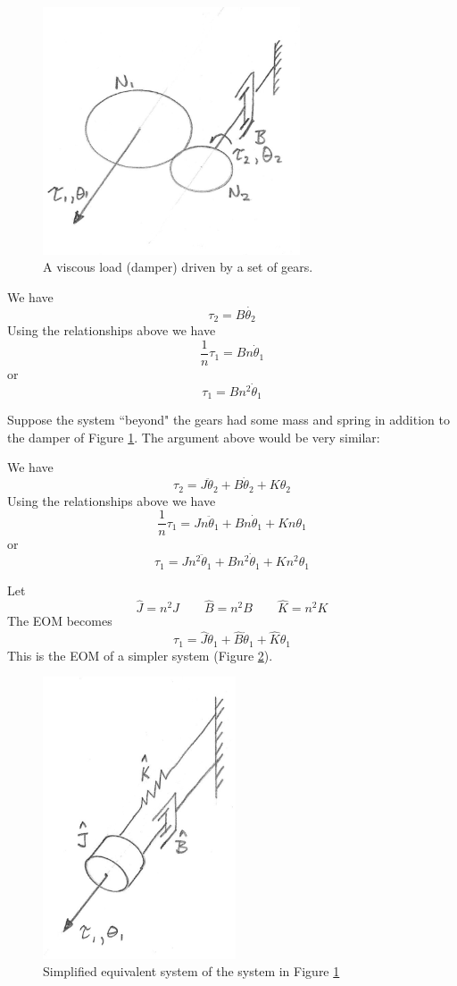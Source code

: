 \begin{figure}\centering
\includegraphics[width=3.0in]{figs03/00745a.png}
\caption{A viscous load (damper) driven by a set of gears.}\label{dampergears}
\end{figure}

We have
\[
\tau_2 = B \dot{\theta_2}
\]
Using the relationships above we have
\[
\frac{1}{n}\tau_1 = Bn\dot{\theta}_1
\]
or
\[
\tau_1 = Bn^2\dot{\theta}_1
\]

Suppose the system ``beyond" the gears had some mass and spring in addition to the damper of Figure \ref{dampergears}. The argument above would be very similar:

We have
\[
\tau_2 = J \ddot{\theta}_2 + B \dot{\theta}_2 + K \theta_2
\]
Using the relationships above we have
\[
\frac{1}{n}\tau_1 =J n \ddot{\theta}_1 + B n\dot{\theta}_1 + K n\theta_1
\]
or
\[
\tau_1 =J n^2 \ddot{\theta}_1 + B n^2\dot{\theta}_1 + K n^2\theta_1
\]

Let
\[
\hat{J} = n^2J \qquad \hat{B} = n^2B \qquad \hat{K} = n^2 K
\]
The EOM becomes
\[
\tau_1 =\hat{J}\ddot{\theta}_1 + \hat{B} \dot{\theta}_1 + \hat{K} \theta_1
\]
This is the EOM of a simpler system (Figure \ref{simplifiedgearsys}).



\begin{figure}\centering
  \includegraphics[width=2.25in]{figs03/00746a.png}
  \caption{Simplified equivalent system of the system in Figure \ref{dampergears}}\label{simplifiedgearsys}
\end{figure}





